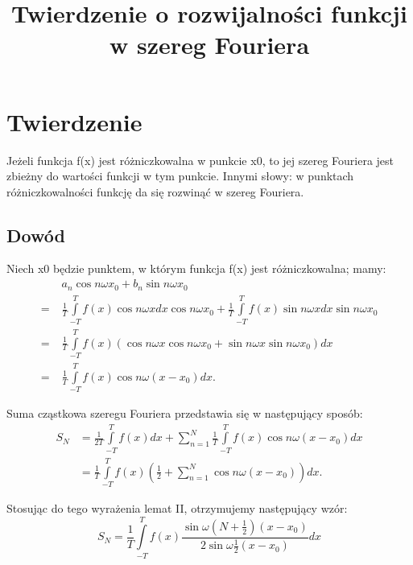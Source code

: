 \documentclass{article}
\begin{document}
\title{Twierdzenie o rozwijalności funkcji w szereg Fouriera}
\maketitle

\section*{Twierdzenie}
Jeżeli funkcja f(x) jest różniczkowalna w punkcie x0, to jej szereg Fouriera jest zbieżny do wartości funkcji w tym punkcie. Innymi słowy: w punktach różniczkowalności funkcję da się rozwinąć w szereg Fouriera. 

\subsection*{Dowód}
Niech x0 będzie punktem, w którym funkcja f(x) jest różniczkowalna; mamy: 
\begin{displaymath}
{\begin{aligned}&\;a_{n}\cos n\omega x_{0}+b_{n}\sin n\omega x_{0}\\=&\;{\frac {1}{T}}\int \limits _{-T}^{T}f(x)\cos n\omega xdx\cos n\omega x_{0}+{\frac {1}{T}}\int \limits _{-T}^{T}f(x)\sin n\omega xdx\sin n\omega x_{0}\\=&\;{\frac {1}{T}}\int \limits _{-T}^{T}f(x)(\cos n\omega x\cos n\omega x_{0}+\sin n\omega x\sin n\omega x_{0})dx\\=&\;{\frac {1}{T}}\int \limits _{-T}^{T}f(x)\cos n\omega (x-x_{0})dx.\end{aligned}}
\end{displaymath}

Suma cząstkowa szeregu Fouriera przedstawia się w następujący sposób: 
\begin{displaymath}
{\begin{aligned}S_{N}&={\frac {1}{2T}}\int \limits _{-T}^{T}f(x)dx+\sum _{n=1}^{N}{\frac {1}{T}}\int \limits _{-T}^{T}f(x)\cos n\omega (x-x_{0})dx\\&={\frac {1}{T}}\int \limits _{-T}^{T}f(x)\left({\frac {1}{2}}+\sum _{n=1}^{N}\cos n\omega (x-x_{0})\right)dx.\end{aligned}}
\end{displaymath}

Stosując do tego wyrażenia lemat II, otrzymujemy następujący wzór: 
\begin{displaymath}
S_{N}={\frac {1}{T}}\int \limits _{-T}^{T}f(x){\frac {\sin \omega \left(N+{\frac {1}{2}}\right)(x-x_{0})}{2\sin \omega {\frac {1}{2}}(x-x_{0})}}dx
\end{displaymath}
\end{document}
